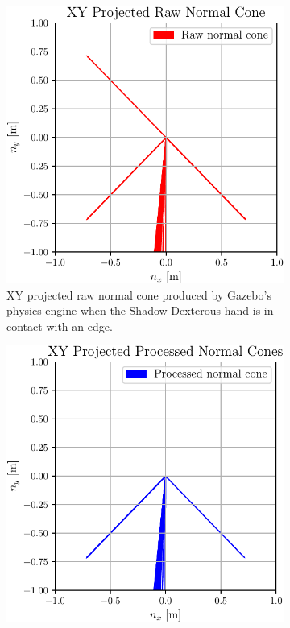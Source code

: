 \begin{figure}[!h]
	\centering
	\begin{subfigure}[b]{0.48\textwidth}
		\centering
		\includegraphics[width=\textwidth]{chapters/1-tactile-perception/fig/matplotlib/xy-projected-raw-normal-cones.pdf}
		\caption{XY projected raw normal cone produced by Gazebo's physics engine when the Shadow Dexterous hand is in contact with an edge.}
		\label{fig:xy-projected-raw-normal-cones}
	\end{subfigure}
	\hfill
	\begin{subfigure}[b]{0.48\textwidth}
		\centering
		\includegraphics[width=\textwidth]{chapters/1-tactile-perception/fig/matplotlib/xy-projected-processed-normal-cones.pdf}

\end{subfigure}
\end{figure}
